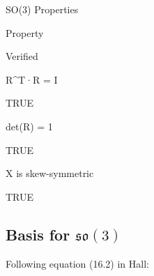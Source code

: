 \documentclass[
]{book}
\theoremstyle{definition}
\theoremstyle{definition}
\theoremstyle{definition}
\theoremstyle{definition}
\theoremstyle{remark}
\begin{document}
\label{tab:so3-implementation}SO(3) Properties

Property

Verified

R\^{}T·R = I

TRUE

det(R) = 1

TRUE

X is skew-symmetric

TRUE

\subsection{\texorpdfstring{Basis for \(\mathfrak{so}(3)\)}{Basis for \textbackslash mathfrak\{so\}(3)}}\label{basis-for-mathfrakso3}

Following equation (16.2) in Hall:
\end{document}
